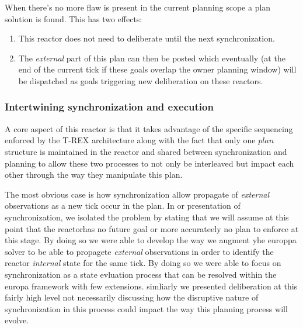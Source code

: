 When there's no more flaw is present in the current planning scope a
plan  solution is found. This has two effects:
\begin{enumerate}
\item This reactor does not need to deliberate until the next synchronization.
\item The {\em external} part of this plan can then be posted which
  eventually (at the end of the current tick if these goals overlap
  the owner planning window) will be dispatched as goals triggering
  new deliberation on these reactors.
\end{enumerate}

\subsubsection{Intertwining synchronization and execution}
\label{sec:arch:intertwine}

A core aspect of this reactor is that it takes advantage of the
specific sequencing enforced by the T-REX architecture along with the
fact that only one $plan$ structure is maintained in the reactor and
shared between synchronization and planning to allow these two processes
to not only be interleaved but impact each other through the way they
manipulate this plan.  

The most obvious case is how synchronization allow propagate of {\em
  external} observations as a new tick occur in the plan. In or
presentation of synchronization, we isolated the problem by stating
that we will assume at this point that the reactorhas no future goal
or more accurateely no plan to enforce at this stage. By doing so we
were able to develop the way we augment yhe europpa solver to be able
to propagete {\em external} observations in order to identify the
reactor {\em internal} state for the same tick. By doing so we were
able to focus on synchronization as a state evluation process that can
be resolved within the europa framework with few extensions. simliarly
we presented deliberation at this fairly high level not necessarily
discussing how the disruptive nature of synchronization in this
process could impact the way this planning process will evolve. 

